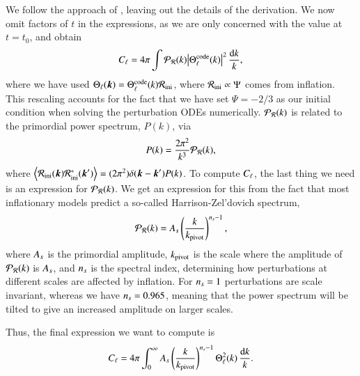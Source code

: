 We follow the approach of \cite[Ch. 9.5]{Dodelson}, leaving out the details of the derivation. We now omit factors of $t$ in the expressions, as we are only concerned with the value at $t=t_0$, and obtain   
\begin{equation} \label{eq:M4:theory:C_ell_integral_definition}
    C_\ell = 4\pi \int \mathcal{P}_{\mathcal{R}} (k) \abs{\Theta_\ell^\mathrm{code}(k)}^2 \,\frac{\dd k}{k},
\end{equation}
where we have used $\Theta_\ell(\boldsymbol{k})= \Theta_\ell^\mathrm{code}(k) \mathcal{R}_\mathrm{ini}$, where $\mathcal{R}_\mathrm{ini}\propto\Psi$ comes from inflation. This rescaling accounts for the fact that we have set $\Psi=-2/3$ as our initial condition when solving the perturbation ODEs numerically. $\mathcal{P}_{\mathcal{R}}(k)$ is related to the primordial power spectrum, $P(k)$, via 
\begin{equation} \label{eq:M4:theory:primordial_power_spectrum_}
    P(k) = \frac{2\pi^2}{k^3}\mathcal{P}_{\mathcal{R}}(k),
\end{equation}
where $\expval{\mathcal{R}_\mathrm{ini}(\ensuremath{\boldsymbol{k}}) \mathcal{R}_\mathrm{ini}^*(\ensuremath{\boldsymbol{k}}')}=(2\pi^2)\delta(\boldsymbol{k}-\boldsymbol{k}') P(k)$. To compute $C_\ell$, the last thing we need is an expression for $\mathcal{P}_{\mathcal{R}}(k)$. We get an expression for this from the fact that most inflationary models predict a so-called Harrison-Zel'dovich spectrum, 
\begin{equation} \label{eq:M4:theory:primordial_power_spectrum}
    \mathcal{P}_{\mathcal{R}}(k) = A_s \left( \frac{k}{k_\mathrm{pivot}} \right)^{n_s-1}, 
\end{equation}
where $A_s$ is the primordial amplitude, $k_\mathrm{pivot}$ is the scale where the amplitude of $\mathcal{P}_{\mathcal{R}}(k)$ is $A_s$, and $n_s$ is the spectral index, determining how perturbations at different scales are affected by inflation. For $n_s=1$ perturbations are scale invariant, whereas we have $n_s=0.965$, meaning that the power spectrum will be tilted to give an increased amplitude on larger scales.   

Thus, the final expression we want to compute is 
\begin{equation} \label{eq:M4:theory:CMB_power_spectrum}
    C_\ell = 4\pi \int_0^\infty A_s \left( \frac{k}{k_\mathrm{pivot}} \right)^{n_s-1} \Theta_\ell^2(k) \, \frac{\dd k}{k}.
\end{equation}

